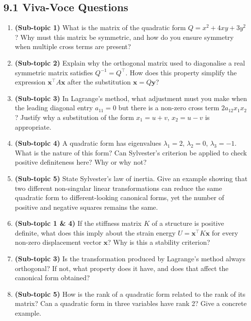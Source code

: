 \documentclass[12pt,a4paper]{article}
\begin{document}
\subsection*{9.1 Viva-Voce Questions}

\begin{enumerate}[leftmargin=2em, label=\textbf{V\arabic*.}]
  \item \textbf{(Sub-topic 1)} What is the matrix of the quadratic form $Q = x^{2} + 4xy + 3y^{2}$? Why must this matrix be symmetric, and how do you ensure symmetry when multiple cross terms are present?

  \item \textbf{(Sub-topic 2)} Explain why the orthogonal matrix used to diagonalise a real symmetric matrix satisfies $Q^{-1} = Q^{\top}$. How does this property simplify the expression $\mathbf{x}^{\top}A\mathbf{x}$ after the substitution $\mathbf{x} = Q\mathbf{y}$?

  \item \textbf{(Sub-topic 3)} In Lagrange's method, what adjustment must you make when the leading diagonal entry $a_{11} = 0$ but there is a non-zero cross term $2a_{12}x_1x_2$? Justify why a substitution of the form $x_1 = u+v$, $x_2 = u-v$ is appropriate.

  \item \textbf{(Sub-topic 4)} A quadratic form has eigenvalues $\lambda_1 = 2$, $\lambda_2 = 0$, $\lambda_3 = -1$. What is the nature of this form? Can Sylvester's criterion be applied to check positive definiteness here? Why or why not?

  \item \textbf{(Sub-topic 5)} State Sylvester's law of inertia. Give an example showing that two different non-singular linear transformations can reduce the same quadratic form to different-looking canonical forms, yet the number of positive and negative squares remains the same.

  \item \textbf{(Sub-topic 1 \& 4)} If the stiffness matrix $K$ of a structure is positive definite, what does this imply about the strain energy $U = \mathbf{x}^{\top}K\mathbf{x}$ for every non-zero displacement vector $\mathbf{x}$? Why is this a stability criterion?

  \item \textbf{(Sub-topic 3)} Is the transformation produced by Lagrange's method always orthogonal? If not, what property does it have, and does that affect the canonical form obtained?

  \item \textbf{(Sub-topic 5)} How is the rank of a quadratic form related to the rank of its matrix? Can a quadratic form in three variables have rank 2? Give a concrete example.
\end{enumerate}
\end{document}
